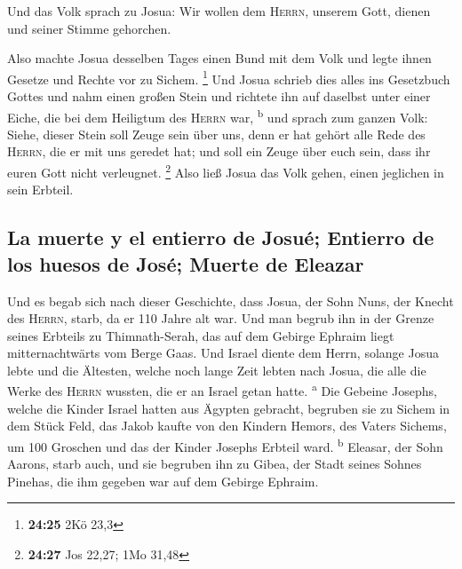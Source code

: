  Und das Volk sprach zu Josua: Wir wollen dem
\textsc{Herrn}, unserem Gott, dienen und seiner Stimme gehorchen.

 Also machte Josua desselben Tages einen Bund mit dem
Volk und legte ihnen Gesetze und Rechte vor zu Sichem. \footnote{\textbf{24:25}
  2Kö 23,3}  Und Josua schrieb dies alles ins Gesetzbuch
Gottes und nahm einen großen Stein und richtete ihn auf daselbst unter
einer Eiche, die bei dem Heiligtum des \textsc{Herrn} war,
\textsuperscript{b}  und sprach zum ganzen Volk: Siehe,
dieser Stein soll Zeuge sein über uns, denn er hat gehört alle Rede des
\textsc{Herrn}, die er mit uns geredet hat; und soll ein Zeuge über euch
sein, dass ihr euren Gott nicht verleugnet. \footnote{\textbf{24:27} Jos
  22,27; 1Mo 31,48}  Also ließ Josua das Volk gehen,
einen jeglichen in sein Erbteil.

\hypertarget{la-muerte-y-el-entierro-de-josuuxe9-entierro-de-los-huesos-de-josuxe9-muerte-de-eleazar}{%
\subsection{La muerte y el entierro de Josué; Entierro de los huesos de
José; Muerte de
Eleazar}\label{la-muerte-y-el-entierro-de-josuuxe9-entierro-de-los-huesos-de-josuxe9-muerte-de-eleazar}}

 Und es begab sich nach dieser Geschichte, dass Josua,
der Sohn Nuns, der Knecht des \textsc{Herrn}, starb, da er 110 Jahre alt
war.  Und man begrub ihn in der Grenze seines Erbteils zu
Thimnath-Serah, das auf dem Gebirge Ephraim liegt mitternachtwärts vom
Berge Gaas.  Und Israel diente dem Herrn, solange Josua
lebte und die Ältesten, welche noch lange Zeit lebten nach Josua, die
alle die Werke des \textsc{Herrn} wussten, die er an Israel getan hatte.
\textsuperscript{a}  Die Gebeine Josephs, welche die
Kinder Israel hatten aus Ägypten gebracht, begruben sie zu Sichem in dem
Stück Feld, das Jakob kaufte von den Kindern Hemors, des Vaters Sichems,
um 100 Groschen und das der Kinder Josephs Erbteil ward.
\textsuperscript{b}  Eleasar, der Sohn Aarons, starb
auch, und sie begruben ihn zu Gibea, der Stadt seines Sohnes Pinehas,
die ihm gegeben war auf dem Gebirge Ephraim.
